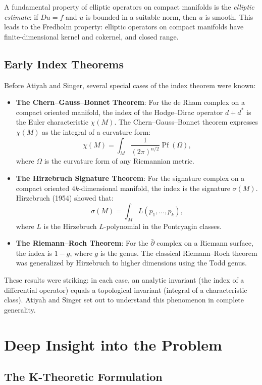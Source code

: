 A fundamental property of elliptic operators on compact manifolds is the \emph{elliptic estimate}: if $Du = f$ and $u$ is bounded in a suitable norm, then $u$ is smooth. This leads to the Fredholm property: elliptic operators on compact manifolds have finite-dimensional kernel and cokernel, and closed range.

\subsection{Early Index Theorems}

Before Atiyah and Singer, several special cases of the index theorem were known:

\begin{itemize}
\item \textbf{The Chern--Gauss--Bonnet Theorem}: For the de Rham complex on a compact oriented manifold, the index of the Hodge--Dirac operator $d + d^*$ is the Euler characteristic $\chi(M)$. The Chern--Gauss--Bonnet theorem expresses $\chi(M)$ as the integral of a curvature form:
\[
\chi(M) = \int_M \frac{1}{(2\pi)^{n/2}} \operatorname{Pf}(\Omega),
\]
where $\Omega$ is the curvature form of any Riemannian metric.

\item \textbf{The Hirzebruch Signature Theorem}: For the signature complex on a compact oriented $4k$-dimensional manifold, the index is the signature $\sigma(M)$. Hirzebruch (1954) showed that:
\[
\sigma(M) = \int_M L(p_1, \ldots, p_k),
\]
where $L$ is the Hirzebruch $L$-polynomial in the Pontryagin classes.

\item \textbf{The Riemann--Roch Theorem}: For the $\bar\partial$ complex on a Riemann surface, the index is $1 - g$, where $g$ is the genus. The classical Riemann--Roch theorem was generalized by Hirzebruch to higher dimensions using the Todd genus.
\end{itemize}

These results were striking: in each case, an analytic invariant (the index of a differential operator) equals a topological invariant (integral of a characteristic class). Atiyah and Singer set out to understand this phenomenon in complete generality.

\section{Deep Insight into the Problem}

\subsection{The K-Theoretic Formulation}

